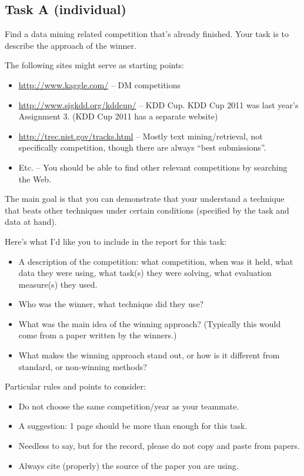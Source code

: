 \documentclass{llncs}
\begin{document}
\subsection{Task A (individual)}
Find a data mining related competition that's already finished. Your task is to describe the approach of the winner.

The following sites might serve as starting points:
\begin{itemize}
	\item \href{http://www.kaggle.com/}{http://www.kaggle.com/} -- DM competitions
	\item \href{http://www.sigkdd.org/kddcup/}{http://www.sigkdd.org/kddcup/} -- KDD Cup. KDD Cup 2011 was last year's Assignment 3. (KDD Cup 2011 has a separate website)
	\item \href{http://trec.nist.gov/tracks.html}{http://trec.nist.gov/tracks.html} -- Mostly text mining/retrieval, not specifically competition, though there are always ``best submissions''.
	\item Etc. -- You should be able to find other relevant competitions by searching the Web.
\end{itemize}

The main goal is that you can demonstrate that your understand a technique that beats other techniques under certain conditions (specified by the task and data at hand). 

Here's what I'd like you to include in the report for this task:
\begin{itemize}
	\item A description of the competition: what competition, when was it held, what data they were using, what task(s) they were solving, what evaluation measure(s) they used.
	\item Who was the winner, what technique did they use?
	\item What was the main idea of the winning approach? (Typically this would come from a paper written by the winners.)
	\item What makes the winning approach stand out, or how is it different from standard, or non-winning methods?
\end{itemize}

Particular rules and points to consider:
\begin{itemize}
	\item Do not choose the same competition/year as your teammate.
	\item A suggestion: 1 page should be more than enough for this task.
	\item Needless to say, but for the record, please do not copy and paste from papers.
	\item Always cite (properly) the source of the paper you are using.
\end{itemize}
\end{document}
